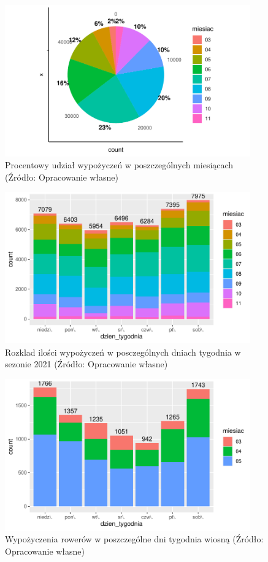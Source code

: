 \documentclass{amuthesis}
\begin{document}
\begin{figure}[t]

{\centering \includegraphics[width=400px]{figures/analiza1kol-1} 

}

\caption{Procentowy udział wypożyczeń w poszczególnych miesiącach  (Źródło: Opracowanie własne)}\label{fig:analiza1kol}
\end{figure}

\begin{figure}[t]

{\centering \includegraphics[width=400px]{figures/analiza1p-1} 

}

\caption{Rozklad ilości wypożyczeń w posczególnych dniach tygodnia w sezonie 2021 (Źródło: Opracowanie własne)}\label{fig:analiza1p}
\end{figure}

\begin{figure}[t]

{\centering \includegraphics[width=400px]{figures/analiza3-1} 

}

\caption{Wypożyczenia rowerów w poszczególne dni tygodnia wiosną (Źródło: Opracowanie własne)}\label{fig:analiza3}
\end{figure}
\end{document}
